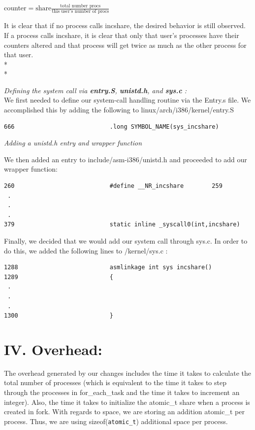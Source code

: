 \documentclass[10pt]{article}
\begin{document}
counter$ = \text{share}\frac{\text{total number procs}}{\text{this user's number of procs}}$

It is clear that if no process calls incshare, the desired behavior is still observed. If a process calls incshare, it is clear that only that user's processes have their counters altered and that process will get twice as much as the other process for that user. \\* 
\\*

{\textit{Defining the system call via \textbf{entry.S}, \textbf{unistd.h}, and \textbf{sys.c} :}} \\

We first needed to define our system-call handling routine via the Entry.s file. We accomplished this by adding the following to linux/arch/i386/kernel/entry.S \\

\begin{verbatim}
666                           .long SYMBOL_NAME(sys_incshare)
\end{verbatim}

{\textit{Adding a unistd.h entry and wrapper function}}

We then added an entry to include/asm-i386/unistd.h and proceeded to add our wrapper function:
\begin{verbatim}
260                           #define __NR_incshare        259
 .
 .
 .
379                           static inline _syscall0(int,incshare)
\end{verbatim}

Finally, we decided that we would add our system call through sys.c. In order to do this, we added the following lines to /kernel/sys.c :
\begin{verbatim}
1288                          asmlinkage int sys incshare()
1289                          {
 .
 .
 .
1300                          }
\end{verbatim}

\section{IV. Overhead:}

The overhead generated by our changes includes the time it takes to calculate the total number of processes (which is equivalent to the time it takes to step through the processes in for\_each\_task and the time it takes to increment an integer). Also, the time it takes to initialize the atomic\_t share when a process is created in fork. With regards to space, we are storing an addition atomic\_t per process. Thus, we are using sizeof(\texttt{atomic\_t}) additional space per process.
\end{document}
